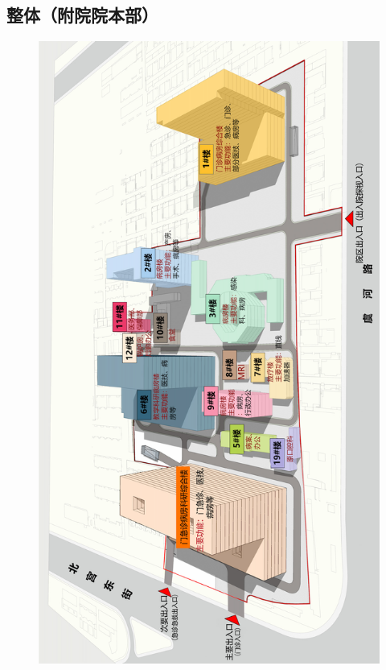 \subsection[整体（附院院本部）]{整体（附院院本部）\footnotemark}
\begin{figure}[H]
    \centering
    \includegraphics*[height=0.9\textheight]{resources/map/附院.jpg}
    \label{map_affiliated_hospital_yuhe}
\end{figure}

\newpage